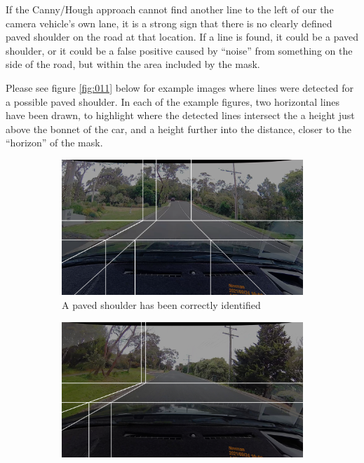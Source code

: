 \documentclass[11pt,twoside]{report}
\begin{document}
If the Canny/Hough approach cannot find another line to the left of our the camera vehicle's own lane, it is a strong sign that there is no clearly defined paved shoulder on the road at that location.  If a line is found, it could be a paved shoulder, or it could be a false positive caused by ``noise'' from something on the side of the road, but within the area included by the mask.

Please see figure \ref{fig:011} below for example images where lines were detected for a possible paved shoulder.  In each of the example figures, two horizontal lines have been drawn, to highlight where the detected lines intersect the a height just above the bonnet of the car, and a height further into the distance, closer to the ``horizon'' of the mask.

\begin{figure}[h]
\centering
\begin{subfigure}{0.3\textwidth}
	\includegraphics[width=\textwidth]{f011_true.png}
	\caption{A paved shoulder has been correctly identified}
	\label{fig:011a}
\end{subfigure}
\hfill
\begin{subfigure}{0.3\textwidth}
	\includegraphics[width=\textwidth]{f011_false_gutter.png}

\end{subfigure}
\end{figure}
\end{document}
